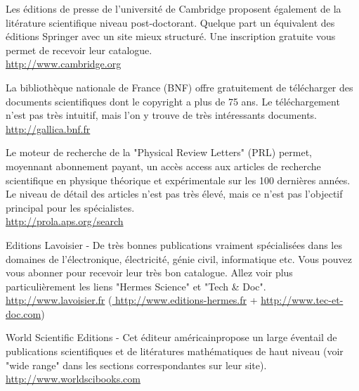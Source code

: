 	{\Large {}}{\Large {}}{\Large {}} Les éditions de presse de l'université de Cambridge proposent également de la litérature scientifique niveau post-doctorant. Quelque part un équivalent des éditions Springer avec un site mieux structuré. Une inscription gratuite vous permet de recevoir leur catalogue.\\
	\href{http://www.cambridge.org}{\color{blue}http://www.cambridge.org}
	
	
	{\Large {}}{\Large {}}{\Large {}}{\Large {}} La bibliothèque nationale de France (BNF) offre gratuitement de télécharger des documents scientifiques dont le copyright a plus de 75 ans. Le téléchargement n'est pas très intuitif, mais l'on y trouve de très intéressants documents.\\
	\href{http://gallica.bnf.fr}{\color{blue} http://gallica.bnf.fr}
	
	{\Large {}}{\Large {}}{\Large {}}{\Large {}} Le moteur de recherche de la "Physical Review Letters" (PRL) permet, moyennant abonnement payant, un accès access aux articles de recherche scientifique en physique théorique et expérimentale sur les 100 dernières années. Le niveau de détail des articles n'est pas très élevé, mais ce n'est pas l'objectif principal pour les spécialistes.\\
	\href{http://prola.aps.org/search}{\color{blue} http://prola.aps.org/search}
	
	\pagebreak
	{\Large {}}{\Large {}}{\Large {}} Editions Lavoisier - De très bonnes publications vraiment spécialisées dans les domaines de l'électronique, électricité, génie civil, informatique etc. Vous pouvez vous abonner pour recevoir leur très bon catalogue. Allez voir plus particulièrement les liens "Hermes Science" et "Tech \& Doc".\\
	\href{http://www.lavoisier.fr}{\color{blue} http://www.lavoisier.fr} (\href{http://www.editions-hermes.fr}{\color{blue} http://www.editions-hermes.fr} + \href{http://www.tec-et-doc.com}{\color{blue} http://www.tec-et-doc.com})
	
	{\Large {}}{\Large {}}{\Large {}} World Scientific Editions - Cet éditeur américainpropose un large éventail de publications scientifiques et de litératures mathématiques de haut niveau (voir "wide range" dans les sections correspondantes sur leur site).\\
	\href{http://www.worldscibooks.com}{\color{blue}http://www.worldscibooks.com}
	
